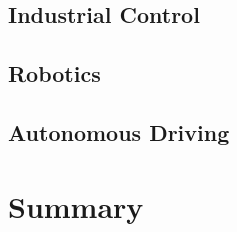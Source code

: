 
 


\subsection*{Industrial Control}



\subsection*{Robotics}





\subsection*{Autonomous Driving}



\section{Summary}\label{sec:path-summary}
